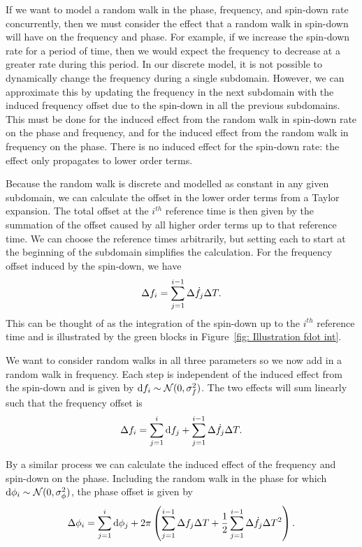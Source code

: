 \documentclass[../full_thesis/full_thesis.tex]{subfiles}
\begin{document}
If we want to model a random walk in the phase, frequency, and spin-down rate
concurrently, then we must consider the effect that a
random walk in spin-down will have on the frequency and phase. For example, if we
increase the spin-down rate for a period of time, then we would expect the frequency
to decrease at a greater rate during this period. In our discrete model, it is
not possible to dynamically change the frequency during a single subdomain.
However, we can approximate this by updating the frequency in the next
subdomain with the induced frequency offset due to the spin-down in all the previous
subdomains. This must be done for the induced effect from the random walk in spin-down rate on
the phase and frequency, and for the induced effect from the random walk in frequency
on the phase. There is no induced effect for the spin-down rate: the effect only
propagates to lower order terms.

Because the random walk is discrete and modelled as constant in any given
subdomain, we can calculate the offset in the lower order terms from a Taylor
expansion. The total offset at the  $i^{th}$ reference time is then given by
the summation of the offset caused by all higher order terms up to that
reference time. We can choose the reference times arbitrarily, but setting each
to start at the beginning of the subdomain simplifies the calculation.  For the
frequency offset induced by the spin-down, we have
\begin{equation}
\Delta f_{i} = \sum_{j=1}^{i-1}\Delta\dot{f}_{j} \Delta T .
\label{eqn: f offset induced}
\end{equation}
This can be thought of as the integration of the spin-down up to the $i^{th}$
reference time and is illustrated by the green blocks in Figure~\ref{fig:
Illustration fdot int}.

We want to consider random walks in all three parameters so we now add in a
random walk in frequency. Each step is independent of the induced effect from
the spin-down and is given by \mbox{$\mathrm{d} f_{i} \sim \mathcal{N}(0, \sigma_{f}^{2})$}. The two
effects will sum linearly such that the frequency offset is
\begin{equation}
\Delta f_{i} = \sum_{j=1}^{i}\mathrm{d} f_{j} + \sum_{j=1}^{i-1}\Delta\dot{f}_{j} \Delta T.
\label{eqn: f offset}
\end{equation}

By a similar process we can calculate the induced effect of the frequency and
spin-down on the phase. Including the random walk in the phase
for which $\mathrm{d} \phi_i \sim \mathcal{N}(0, \sigma_{\phi}^{2})$, the phase offset is given by
\begin{equation}
\Delta\phi_{i}  =  \sum_{j=1}^{i}\mathrm{d} \phi_{j}
+ 2\pi\left(\sum_{j=1}^{i-1}\Delta f_{j}\Delta T
+ \frac{1}{2}\sum_{j=1}^{i-1}\Delta \dot{f}_{j}\Delta T^{2}\right).
\label{eqn: phi offset}
\end{equation}
\end{document}

